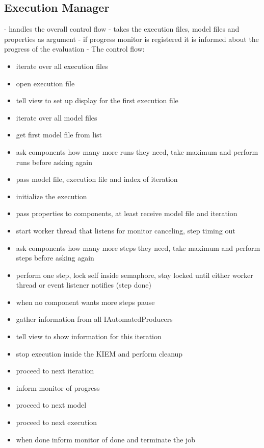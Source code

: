 \subsection{Execution Manager}
- handles the overall control flow
- takes the execution files, model files and properties as argument
- if progress monitor is registered it is informed about the progress of the evaluation
- The control flow:
\begin{itemize}
 \item iterate over all execution files
 \item open execution file
 \item tell view to set up display for the first execution file
 \item iterate over all model files
 \item get first model file from list
 \item ask components how many more runs they need, take maximum and perform runs before asking again
 \item pass model file, execution file and index of iteration
 \item initialize the execution
 \item pass properties to components, at least receive model file and iteration
 \item start worker thread that listens for monitor canceling, step timing out
 \item ask components how many more steps they need, take maximum and perform steps before asking again
 \item perform one step, lock self inside semaphore, stay locked until either worker thread or event listener notifies (step done)
 \item when no component wants more steps pause
 \item gather information from all IAutomatedProducers
 \item tell view to show information for this iteration
 \item stop execution inside the KIEM and perform cleanup
 \item proceed to next iteration
 \item inform monitor of progress
 \item proceed to next model
 \item proceed to next execution
 \item when done inform monitor of done and terminate the job
\end{itemize}




